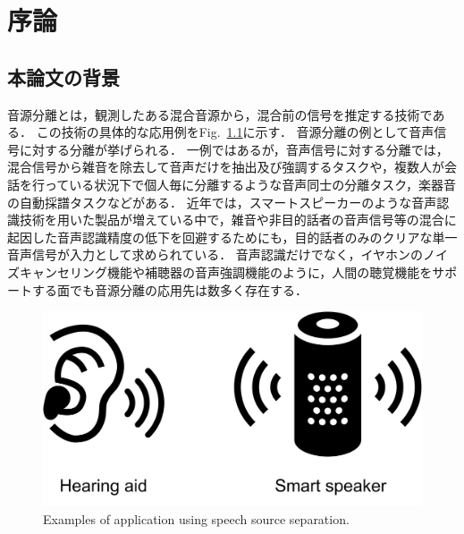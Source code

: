 \chapter{序論}
\label{chap:intro}

\section{本論文の背景}

音源分離とは，観測したある混合音源から，混合前の信号を推定する技術である．
この技術の具体的な応用例をFig.~\ref{fig:apps}に示す．
音源分離の例として音声信号に対する分離が挙げられる．
一例ではあるが，音声信号に対する分離では，混合信号から雑音を除去して音声だけを抽出及び強調するタスクや，複数人が会話を行っている状況下で個人毎に分離するような音声同士の分離タスク，楽器音の自動採譜タスクなどがある．
近年では，スマートスピーカーのような音声認識技術を用いた製品が増えている中で，雑音や非目的話者の音声信号等の混合に起因した音声認識精度の低下を回避するためにも，目的話者のみのクリアな単一音声信号が入力として求められている．
音声認識だけでなく，イヤホンのノイズキャンセリング機能や補聴器の音声強調機能のように，人間の聴覚機能をサポートする面でも音源分離の応用先は数多く存在する．
\begin{figure}[t]
    \vspace{4pt}
    \begin{center}
        \includegraphics[width=0.7\columnwidth]{figures/using_audio_sep.pdf}
    \end{center}
    \vspace{-8pt}
	\caption{Examples of application using speech source separation.}
	\label{fig:apps}
\end{figure}

